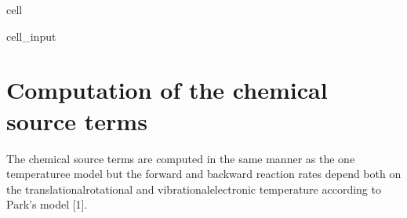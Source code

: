 \documentclass[letterpaper,10pt,english]{jupyterBook}
\begin{document}
\begin{sphinxuseclass}{cell}
\begin{sphinxVerbatimInput}
\begin{sphinxuseclass}{cell_input}
\begin{sphinxVerbatim}[commandchars=\\\{\}]
  
  
\end{sphinxVerbatim}

\end{sphinxuseclass}\end{sphinxVerbatimInput}

\end{sphinxuseclass}

\section{Computation of the chemical source terms}
\label{\detokenize{2_Temperature/_2T_Problem_class_definition:computation-of-the-chemical-source-terms}}
\sphinxAtStartPar
The chemical source terms are computed in the same manner as the one temperaturee model but the forward and backward reaction rates depend both on the translational\sphinxhyphen{}rotational and vibrational\sphinxhyphen{}electronic temperature according to Park’s model {[}1{]}.
\end{document}
